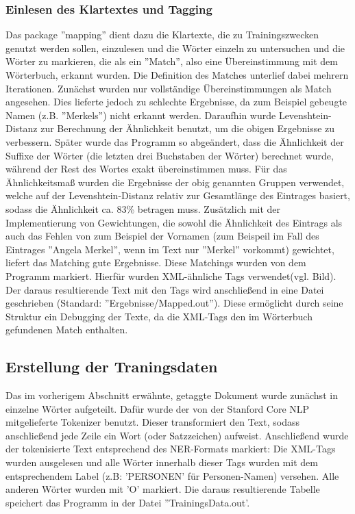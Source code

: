 \documentclass[a4paper]{article}
\begin{document}
		\subsubsection{Einlesen des Klartextes und Tagging}
			Das package ''mapping'' dient dazu die Klartexte, die zu Trainingszwecken genutzt werden sollen, einzulesen und die Wörter einzeln zu untersuchen und die Wörter zu markieren, die als ein ''Match'', also eine Übereinstimmung mit dem Wörterbuch, erkannt wurden.
			Die Definition des Matches unterlief dabei mehrern Iterationen.
			Zunächst wurden nur vollständige Übereinstimmungen als Match angesehen.
			Dies lieferte jedoch zu schlechte Ergebnisse, da zum Beispiel gebeugte Namen (z.B. ''Merkels'') nicht erkannt werden.
			Daraufhin wurde Levenshtein-Distanz zur Berechnung der Ähnlichkeit benutzt, um die obigen Ergebnisse zu verbessern.
			Später wurde das Programm so abgeändert, dass die Ähnlichkeit der Suffixe der Wörter (die letzten drei Buchstaben der Wörter) berechnet wurde, während der Rest des Wortes exakt übereinstimmen muss.
			Für das Ähnlichkeitsmaß wurden die Ergebnisse der obig genannten Gruppen verwendet, welche auf der Levenshtein-Distanz relativ zur Gesamtlänge des Eintrages basiert, sodass die Ähnlichkeit ca. 83\% betragen muss.
			Zusätzlich mit der Implementierung von Gewichtungen, die sowohl die Ähnlichkeit des Eintrags als auch das Fehlen von zum Beispiel der Vornamen (zum Beispeil im Fall des Eintrages ''Angela Merkel'', wenn im Text nur ''Merkel'' vorkommt) gewichtet, liefert das Matching gute Ergebnisse.
			Diese Matchings wurden von dem Programm markiert.
			Hierfür wurden XML-ähnliche Tags verwendet(vgl. Bild).
			Der daraus resultierende Text mit den Tags wird anschließend in eine Datei geschrieben (Standard: ''Ergebnisse/Mapped.out'').
			Diese ermöglicht durch seine Struktur ein Debugging der Texte, da die XML-Tags den im Wörterbuch gefundenen Match enthalten.

	\subsection{Erstellung der Traningsdaten}
		Das im vorherigem Abschnitt erwähnte, getaggte Dokument wurde zunächst in einzelne Wörter aufgeteilt.
		Dafür wurde der von der Stanford Core NLP mitgelieferte Tokenizer benutzt.
		Dieser transformiert den Text, sodass anschließend jede Zeile ein Wort (oder Satzzeichen) aufweist.
		Anschließend wurde der tokenisierte Text entsprechend des NER-Formats markiert: Die XML-Tags wurden ausgelesen und alle Wörter innerhalb dieser Tags wurden mit dem entsprechendem Label (z.B: 'PERSONEN' für Personen-Namen) versehen. Alle anderen Wörter wurden mit 'O' markiert.
		Die daraus resultierende Tabelle speichert das Programm in der Datei ''TrainingsData.out'.
\end{document}
